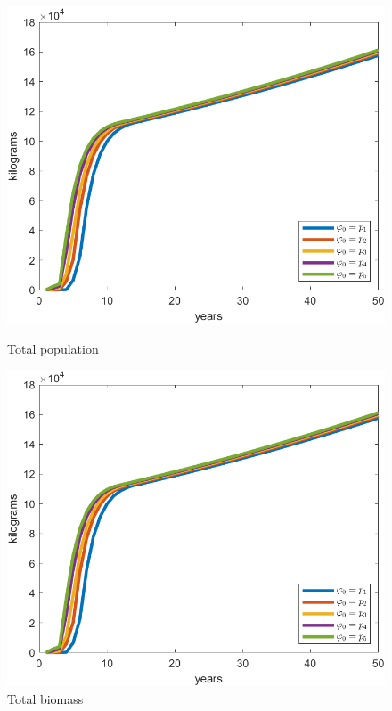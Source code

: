 \begin{figure}[H]
	\centering
	\begin{minipage}{.48\textwidth}
		\includegraphics[width=\linewidth]{Images/F=1000/total_biomass_when_f=1000}
		\caption{Total population}
		\label{fig:totalpopwhenf=1000}
	\end{minipage} \quad 
	\centering
	\begin{minipage}{.48\textwidth}
		\includegraphics[width=\linewidth]{Images/F=1000/total_biomass_when_f=1000}
		\caption{Total biomass}
		\label{fig:totalbiomasswhenf=1000}
	\end{minipage}
\end{figure}

